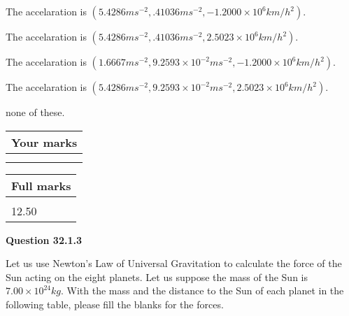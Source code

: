 \documentclass[12pt]{article}
\begin{document}
  
 
 
The accelaration is
$(
5.4286ms^{-2},
.41036ms^{-2},
-1.2000 \times 10^{6}km/h^2
).
$
 
 
The accelaration is
$(
5.4286ms^{-2},
.41036ms^{-2},
2.5023 \times 10^{6}km/h^2
).
$
 
 
The accelaration is
$(
1.6667ms^{-2},
9.2593 \times 10^{-2}ms^{-2},
-1.2000 \times 10^{6}km/h^2
).
$
 
 
The accelaration is
$(
5.4286ms^{-2},
9.2593 \times 10^{-2}ms^{-2},
2.5023 \times 10^{6}km/h^2
).
$
 
 
none of these.
 
 
 
 

 
\vspace{0.3in}
  
\vspace{0.2in}
  
         \begin{tabular}{|l|}
\hline
 Your marks  \\
\hline
 \\ 
 \\ 
\hline
\end{tabular}
\hspace{0.05in} \begin{tabular}{|l|}
\hline
 Full marks  \\
\hline
 \\ 
12.50 \\
\hline
\end{tabular}
{\textbf{\Large{Question
32.1.3 
}}}
  
  
Let us use Newton's Law of Universal Gravitation to calculate the force
of the Sun acting on the eight planets. Let us suppose the mass of the
Sun is $ %
7.00 \times 10^{24} kg$. With the mass and the
distance to the Sun of each planet in the following table, please fill
the blanks for the forces.
 
\vspace{0.2in}
 
\end{document}
